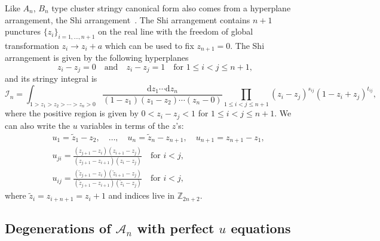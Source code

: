 \documentclass[hidelinks,12pt]{article}
\begin{document}

Like $A_n$, $B_n$ type cluster stringy canonical form also comes from a hyperplane 
arrangement, the Shi arrangement~\cite{shi1986kazhdan}. The Shi arrangement contains $n+1$ punctures 
$\{z_i\}_{i=1,\dots,n+1}$ on the real line with the freedom of global transformation 
$z_i\to z_i+a$ which can be used to fix $z_{n+1}=0$. The Shi arrangement is 
given by the following hyperplanes
\[
	z_i-z_j=0\quad \text{and}\quad z_i-z_j=1\quad \text{for $1\leq i<j\leq n+1$},
\]
and its stringy integral is 
\begin{equation}
\mathcal I_n = \int_{1>z_1>z_2>\cdots >z_n>0}
\frac{\mathrm dz_1\cdots \mathrm dz_{n}}{(1-z_1)(z_1-z_2)\cdots (z_{n}-0)}
\prod_{1\leq i<j \leq n+1}(z_i-z_j)^{s_{ij}}(1-z_i+z_j)^{t_{ij}},
\end{equation}
where the positive region is given by $0<z_i-z_j<1$ for $1\leq i<j \leq n+1$.
We can also write the $u$ variables in terms of the $z$'s:
\begin{align*}
    &u_1=\tilde z_1-z_2,\quad \dots,\quad u_{n}=\tilde z_{n}-z_{n+1},
    \quad u_{n+1}=z_{n+1}-z_1,\\
    &u_{ji}=\frac{(z_{j+1}-z_{i})(z_{i+1}-z_j)}{(z_{j+1}-z_{i+1})(z_i-z_j)}\quad \text{for $i<j$},\\
    &u_{ij}=\frac{(\tilde z_{j+1}-z_{i})(\tilde z_{i+1}-z_j)}{(\tilde z_{j+1}-z_{i+1})(\tilde z_i-z_j)}\quad \text{for $i<j$},
\end{align*}
where $\tilde{z}_i=z_{i+n+1}=z_{i}+1$ and indices live in $\mathbb Z_{2n+2}$.

\subsection{Degenerations of $\mathscr A_n$ with perfect $u$ equations} 
\end{document}
